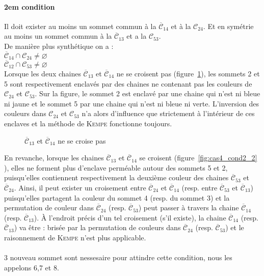 \paragraph{2em condition}
Il doit exister au moins un sommet commun à la $\overline{\mathcal{C}}_{14}$ et à la $\mathcal{C}_{24}$. Et en symétrie au moins un sommet commun à la $\overline{\mathcal{C}}_{13}$ et a la $\mathcal{C}_{53}$.\\
De manière plus synthétique on a :\\
$\overline{\mathcal{C}}_{14}\cap\mathcal{C}_{24}\not=\varnothing$\\
$\overline{\mathcal{C}}_{12}\cap\mathcal{C}_{53}\not=\varnothing$\\
Lorsque les deux chaines $\overline{\mathcal{C}}_{13}$ et $\overline{\mathcal{C}}_{14}$ ne se croisent pas (figure~\ref{fig:cas4_cond2_1}), les sommets 2 et 5 sont respectivement enclavés par des chaines ne contenant pas les couleurs de $\mathcal{C}_{24}$ et $\mathcal{C}_{53}$. Sur la figure, le sommet 2 est enclavé par une chaine qui n’est ni bleue ni jaune et le sommet 5 par une chaine qui n’est ni bleue ni verte. L’inversion des couleurs dans $\mathcal{C}_{24}$ et $\mathcal{C}_{53}$ n’a alors d’influence que strictement à l’intérieur de ces enclaves et la méthode de \textsc{Kempe} fonctionne toujours.\\

\begin{figure}[!ht]\centering
	\begin{changemargin}{-3cm}{-3cm}
		\begin{center}
			
			\caption{$\overline{\mathcal{C}}_{13}$ et $\overline{\mathcal{C}}_{14}$ ne se croise pas}\label{fig:cas4_cond2_1}
		\end{center}
	\end{changemargin}
\end{figure}
\FloatBarrier
En revanche, lorsque les chaines $\overline{\mathcal{C}}_{13}$ et $\overline{\mathcal{C}}_{14}$ se croisent (figure~\ref{fig:cas4_cond2_2} ), elles ne forment plus d’enclave perméable autour des sommets 5 et 2, puisqu’elles contiennent respectivement la deuxième couleur des chaines $\overline{\mathcal{C}}_{53}$ et $\overline{\mathcal{C}}_{24}$. Ainsi, il peut exister un croisement entre $\overline{\mathcal{C}}_{24}$ et $\overline{\mathcal{C}}_{14}$ (resp. entre $\overline{\mathcal{C}}_{53}$ et $\overline{\mathcal{C}}_{13}$) puisqu’elles partagent la couleur du sommet 4 (resp. du sommet 3) et la permutation de couleur dans $\overline{\mathcal{C}}_{24}$ (resp. $\overline{\mathcal{C}}_{53}$) peut passer à travers la chaine $\overline{\mathcal{C}}_{14}$ (resp. $\overline{\mathcal{C}}_{13}$). À l’endroit précis d’un tel croisement (s’il existe), la chaine $\overline{\mathcal{C}}_{14}$ (resp. $\overline{\mathcal{C}}_{13}$) va être :
brisée par la permutation de couleurs dans $\overline{\mathcal{C}}_{24}$ (resp. $\overline{\mathcal{C}}_{53}$) et le raisonnement de \textsc{Kempe} n’est plus applicable.\\
\\
3 nouveau sommet sont nessesaire pour attindre cette condition, nous les appelons 6,7 et 8.

